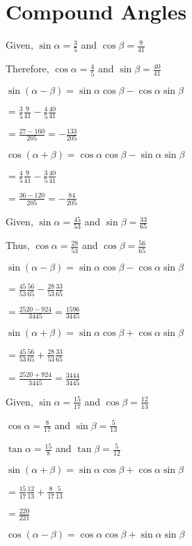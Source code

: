 \chapter{Compound Angles}
\startitemize[n, 1*broad]
\item Given, $\sin\alpha = \frac{3}{5}$ and $\cos\beta = \frac{9}{41}$

  Therefore, $\cos\alpha = \frac{4}{5}$ and $\sin\beta = \frac{40}{41}$

  $\sin(\alpha - \beta) = \sin\alpha\cos\beta - \cos\alpha\sin\beta$

  $= \frac{3}{5}\frac{9}{41} - \frac{4}{5}\frac{40}{41}$

  $= \frac{27 - 160}{205} = -\frac{133}{205}$

  $\cos(\alpha + \beta) = \cos\alpha\cos\beta - \sin\alpha\sin\beta$

  $= \frac{4}{5}\frac{9}{41} - \frac{3}{5}\frac{40}{41}$

  $= \frac{36 - 120}{205} = -\frac{84}{205}$

\item Given, $\sin\alpha = \frac{45}{53}$ and $\sin\beta = \frac{33}{65}$

  Thus, $\cos\alpha = \frac{28}{53}$ and $\cos\beta = \frac{56}{65}$

  $\sin(\alpha - \beta) = \sin\alpha\cos\beta - \cos\alpha\sin\beta$

  $= \frac{45}{53}\frac{56}{65} - \frac{28}{53}\frac{33}{65}$

  $= \frac{2520 - 924}{3445} = \frac{1596}{3445}$

  $\sin(\alpha + \beta) = \sin\alpha\cos\beta + \cos\alpha\sin\beta$

  $= \frac{45}{53}\frac{56}{65} + \frac{28}{53}\frac{33}{65}$

  $= \frac{2520 + 924}{3445} = \frac{3444}{3445}$

\item Given, $\sin\alpha = \frac{15}{17}$ and $\cos\beta = \frac{12}{13}$

  $\cos\alpha = \frac{8}{17}$ and $\sin\beta = \frac{5}{13}$

  $\tan\alpha = \frac{15}{8}$ and $\tan\beta = \frac{5}{12}$

  $\sin(\alpha + \beta) = \sin\alpha\cos\beta + \cos\alpha\sin\beta$

  $= \frac{15}{17}\frac{12}{13} + \frac{8}{17}\frac{5}{13}$

  $= \frac{220}{221}$

  $\cos(\alpha - \beta) = \cos\alpha\cos\beta + \sin\alpha\sin\beta$

